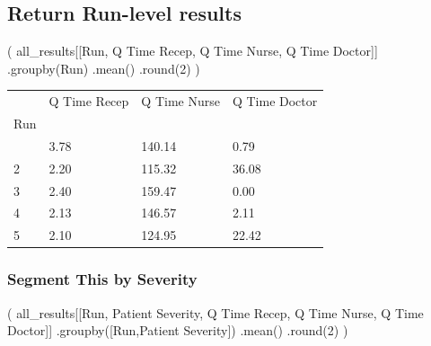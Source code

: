 \documentclass[
  letterpaper,
  DIV=11,
  numbers=noendperiod]{scrreprt}
\newenvironment{Shaded}{}{}
\newcommand{\BuiltInTok}[1]{\textcolor[rgb]{0.84,0.23,0.29}{#1}}
\newcommand{\DecValTok}[1]{\textcolor[rgb]{0.00,0.36,0.77}{#1}}
\newcommand{\NormalTok}[1]{\textcolor[rgb]{0.14,0.16,0.18}{#1}}
\newcommand{\StringTok}[1]{\textcolor[rgb]{0.01,0.18,0.38}{#1}}
\begin{document}
\subsection{Return Run-level results}\label{return-run-level-results}

\begin{Shaded}
\begin{Highlighting}[]
\NormalTok{(}
\NormalTok{    all\_results[[}\StringTok{\textquotesingle{}Run\textquotesingle{}}\NormalTok{, }\StringTok{\textquotesingle{}Q Time Recep\textquotesingle{}}\NormalTok{, }\StringTok{\textquotesingle{}Q Time Nurse\textquotesingle{}}\NormalTok{, }\StringTok{\textquotesingle{}Q Time Doctor\textquotesingle{}}\NormalTok{]]}
\NormalTok{    .groupby(}\StringTok{\textquotesingle{}Run\textquotesingle{}}\NormalTok{)}
\NormalTok{    .mean()}
\NormalTok{    .}\BuiltInTok{round}\NormalTok{(}\DecValTok{2}\NormalTok{)}
\NormalTok{)}
\end{Highlighting}
\end{Shaded}

\begin{longtable}[]{@{}llll@{}}
\toprule\noalign{}
& Q Time Recep & Q Time Nurse & Q Time Doctor \\
Run & & & \\
\midrule\noalign{}
\endhead
\bottomrule\noalign{}
\endlastfoot
1 & 3.78 & 140.14 & 0.79 \\
2 & 2.20 & 115.32 & 36.08 \\
3 & 2.40 & 159.47 & 0.00 \\
4 & 2.13 & 146.57 & 2.11 \\
5 & 2.10 & 124.95 & 22.42 \\
\end{longtable}

\subsubsection{Segment This by
Severity}\label{segment-this-by-severity-1}

\begin{Shaded}
\begin{Highlighting}[]
\NormalTok{(}
\NormalTok{    all\_results[[}\StringTok{\textquotesingle{}Run\textquotesingle{}}\NormalTok{, }\StringTok{\textquotesingle{}Patient Severity\textquotesingle{}}\NormalTok{, }\StringTok{\textquotesingle{}Q Time Recep\textquotesingle{}}\NormalTok{, }\StringTok{\textquotesingle{}Q Time Nurse\textquotesingle{}}\NormalTok{, }\StringTok{\textquotesingle{}Q Time Doctor\textquotesingle{}}\NormalTok{]]}
\NormalTok{    .groupby([}\StringTok{\textquotesingle{}Run\textquotesingle{}}\NormalTok{,}\StringTok{\textquotesingle{}Patient Severity\textquotesingle{}}\NormalTok{])}
\NormalTok{    .mean()}
\NormalTok{    .}\BuiltInTok{round}\NormalTok{(}\DecValTok{2}\NormalTok{)}
\NormalTok{)}
\end{Highlighting}
\end{Shaded}
\end{document}
